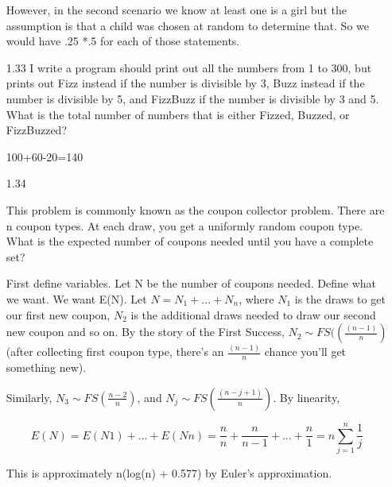 \begin{enumerate}
However, in the second scenario we know at least one is a girl but the assumption is that a child was chosen at random to determine that. So we would have .25 *.5 for each of those statements.

\item[1.33]
I write a program should print out all the numbers from 1 to 300, but prints out Fizz instead if the number is divisible by 3, Buzz instead if the number is divisible by 5, and FizzBuzz if the number is divisible by 3 and 5. What is the total number of numbers that is either Fizzed, Buzzed, or FizzBuzzed?

100+60-20=140

\item[1.34]

This problem is commonly known as the coupon collector problem. There are n coupon types. At each draw, you get a uniformly random coupon type. What is the expected number of coupons needed until you have a complete set?

First define variables. Let N be the number of coupons needed. Define what we want. We want E(N). Let $N=N_1+...+N_n$, where $N_1$ is the draws to get our first new coupon, $N_2$ is the additional draws needed to draw our second new coupon and so on. By the story of the First Success, $N_2 \sim FS((\frac{(n -1)}{n})$ (after collecting first coupon type, there's an $\frac{(n - 1)}{n}$ chance you’ll get something new). 

Similarly, $N_3 \sim FS(\frac{n-2}{n})$, and $N_j \sim FS(\frac{(n - j +1)}{n})$. By linearity, 

\begin{equation}
E(N)=E(N1)+...+E(Nn)= \frac{n}{n} +\frac{n}{n-1} + ... + \frac{n}{1} = n \sum_{j=1}^{n}{\frac{1}{j}}
\end{equation}

This is approximately n(log(n) + 0.577) by Euler’s approximation.





\end{enumerate}